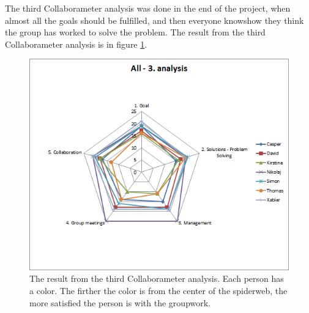 The third Collaborameter analysis was done in the end of the project, when almost all the goals should be fulfilled, and then everyone knowshow they think the group has worked to solve the problem. The result from the third Collaborameter analysis is in figure \ref{fig:3analysisCollaborameter}.

\begin{figure}
\centering
\includegraphics[width=0.7\linewidth]{./graphics/3analysisCollaborameter}
\caption{The result from the third Collaborameter analysis. Each person has a color. The firther the color is from the center of the spiderweb, the more satisfied the person is with the groupwork.}
\label{fig:3analysisCollaborameter}
\end{figure}

